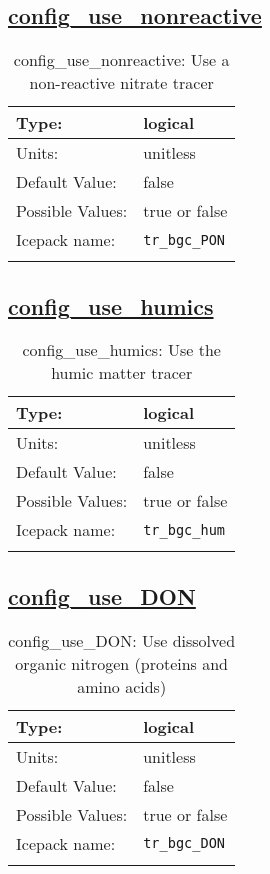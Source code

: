 \subsection[config\_use\_nonreactive]{\hyperref[sec:nm_tab_biogeochemistry]{config\_use\_nonreactive}}
\label{subsec:nm_sec_config_use_nonreactive}
\begin{center}
\begin{longtable}{| p{2.0in} || p{4.0in} |}
    \hline
    Type: & logical \\
    \hline
    Units: & \si{unitless} \\
    \hline
    Default Value: & false \\
    \hline
    Possible Values: & true or false \\
    \hline
    Icepack name: & \verb+tr_bgc_PON+ \\
    \hline
    \caption{config\_use\_nonreactive: Use a non-reactive nitrate tracer}
\end{longtable}
\end{center}
\subsection[config\_use\_humics]{\hyperref[sec:nm_tab_biogeochemistry]{config\_use\_humics}}
\label{subsec:nm_sec_config_use_humics}
\begin{center}
\begin{longtable}{| p{2.0in} || p{4.0in} |}
    \hline
    Type: & logical \\
    \hline
    Units: & \si{unitless} \\
    \hline
    Default Value: & false \\
    \hline
    Possible Values: & true or false \\
    \hline
    Icepack name: & \verb+tr_bgc_hum+ \\
    \hline
    \caption{config\_use\_humics: Use the humic matter tracer}
\end{longtable}
\end{center}
\subsection[config\_use\_DON]{\hyperref[sec:nm_tab_biogeochemistry]{config\_use\_DON}}
\label{subsec:nm_sec_config_use_DON}
\begin{center}
\begin{longtable}{| p{2.0in} || p{4.0in} |}
    \hline
    Type: & logical \\
    \hline
    Units: & \si{unitless} \\
    \hline
    Default Value: & false \\
    \hline
    Possible Values: & true or false \\
    \hline
    Icepack name: & \verb+tr_bgc_DON+ \\
    \hline
    \caption{config\_use\_DON: Use dissolved organic nitrogen (proteins and amino acids)}
\end{longtable}
\end{center}
